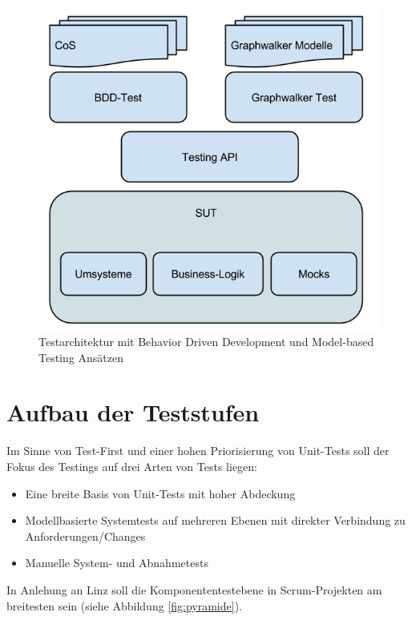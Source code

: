 \begin{figure}[h] 
  \centering
     \includegraphics[width=1.0\textwidth]{figures/Testarchitektur-MBT-BDD-COS.png}
  \caption{Testarchitektur mit Behavior Driven Development und Model-based Testing Ansätzen}
  \label{fig:testarchitektur}
\end{figure}

\section{Aufbau der Teststufen}
Im Sinne von \Gls{Test-First} und einer hohen Priorisierung von Unit-Tests soll der Fokus des Testings auf drei Arten von Tests liegen:

\begin{itemize}
\item Eine breite Basis von Unit-Tests mit hoher Abdeckung
\item Modellbasierte Systemtests auf mehreren Ebenen mit direkter Verbindung zu Anforderungen/Changes
\item Manuelle System- und Abnahmetests
\end{itemize}

In Anlehung an Linz \cite{linz_testing_2014} soll die Komponententestebene in Scrum-Projekten am breitesten sein (siehe Abbildung \ref{fig:pyramide}).

